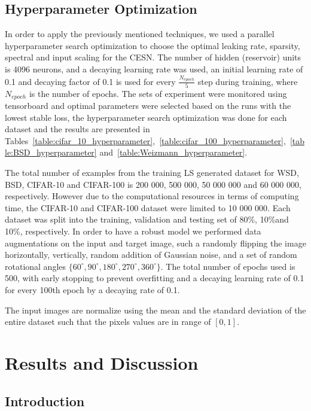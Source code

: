 \documentclass{WitsPhysicsReport}
\begin{document}
\subsection{Hyperparameter Optimization}


In order to apply the previously mentioned techniques, we used a parallel hyperparameter search optimization to choose the optimal leaking rate, sparsity, spectral and input scaling for the CESN. The number of hidden (reservoir) units is 4096 neurons, and a decaying learning rate was used, an initial learning rate of 0.1 and  decaying factor of 0.1 is used for every $\frac{N_{epoch}}{5}$ step during training, where $N_{epoch}$ is the number of epochs. The sets of experiment were monitored using tensorboard and optimal parameters were selected based on the runs with the lowest stable loss, the hyperparameter search optimization was done for each dataset and the results are presented in Tables~\ref{table:cifar_10_hyperparameter},~\ref{table:cifar_100_hyperparameter},~\ref{table:BSD_hyperparameter} and~\ref{table:Weizmann_hyperparameter}. 

The total number of examples from the training LS generated dataset for WSD, BSD, CIFAR-10 and CIFAR-100 is 200 000, 500 000, 50 000 000 and 60 000 000, respectively. However due to the computational resources in terms of computing time, the CIFAR-10 and CIFAR-100 dataset were limited to 10 000 000. Each dataset was split into the training, validation and testing set of 80\%, 10\%and 10\%, respectively. In order to have a robust model we performed data augmentations on the input and target image, such a randomly flipping the image horizontally, vertically, random addition of Gaussian noise, and a set of random rotational angles $\{60^{\circ}, 90^{\circ}, 180^{\circ}, 270^{\circ}, 360^{\circ} \}$. The total number of epochs used is 500, with early stopping to prevent overfitting and a decaying learning rate of 0.1 for every 100th epoch by a decaying rate of 0.1. 

The input images are normalize using the mean and the standard deviation of the entire dataset such that the pixels values are in range of $[0, 1]$.


\newpage
\section{Results and Discussion }
\label{sec:Experiments}

\subsection{Introduction}
\end{document}
